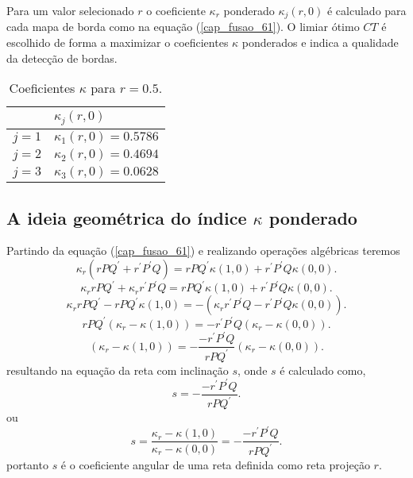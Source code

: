 Para um valor selecionado $r$ o coeficiente $\kappa_r$ ponderado $\kappa_j(r,0)$ é calculado para cada mapa de borda como na equação (\ref{cap_fusao_61}). O limiar ótimo $CT$ é escolhido de forma a maximizar o coeficientes $\kappa$ ponderados e indica a qualidade da detecção de bordas. 


\begin{table}[hbt]
	\centering
	\caption{Coeficientes $\kappa$ para $r=0.5$.}\label{cap_fusao_tab05}
\begin{tabular}{@{}ll@{}} \toprule
	     & $\kappa_j(r,0)$  \\ \midrule
	$j=1$  & $\kappa_1(r,0)= 0.5786$    \\ 
	$j=2$  & $\kappa_2(r,0)= 0.4694$    \\ 
    $j=3$  & $\kappa_3(r,0)= 0.0628$    \\ \bottomrule 
\end{tabular}
\end{table}

\subsection{A ideia geométrica do índice $\kappa$ ponderado}

Partindo da equação (\ref{cap_fusao_61}) e realizando operações algébricas teremos
\begin{equation}\nonumber
	\kappa_r (rPQ^{'} +r^{'}P^{'}Q)= rPQ^{'}\kappa(1,0) +r^{'}P^{'}Q\kappa(0,0).
\end{equation}
\begin{equation}\nonumber
	\kappa_r rPQ^{'} +\kappa_r r^{'}P^{'}Q= rPQ^{'}\kappa(1,0) +r^{'}P^{'}Q\kappa(0,0).
\end{equation}
\begin{equation}\nonumber
	\kappa_r rPQ^{'}-rPQ^{'}\kappa(1,0) = -( \kappa_r r^{'}P^{'}Q-r^{'}P^{'}Q\kappa(0,0)).
\end{equation}
\begin{equation}\nonumber
	rPQ^{'}(\kappa_r-\kappa(1,0)) = -r^{'}P^{'}Q( \kappa_r -\kappa(0,0)).
\end{equation}
\begin{equation}\label{cap_fusao_62}
	(\kappa_r-\kappa(1,0)) = - \frac{-r^{'}P^{'}Q}{rPQ^{'}}\left( \kappa_r -\kappa(0,0)\right).
\end{equation}
resultando na equação da reta com inclinação $s$, onde $s$ é calculado como,
\begin{equation}\label{cap_fusao_63}
	s = - \frac{-r^{'}P^{'}Q}{rPQ^{'}}.
\end{equation}
ou 
\begin{equation}\label{cap_fusao_64}
	s = \frac{\kappa_r-\kappa(1,0)}{ \kappa_r -\kappa(0,0)} = - \frac{-r^{'}P^{'}Q}{rPQ^{'}}.
\end{equation}
portanto $s$ é o coeficiente angular de uma reta definida como reta projeção $r$.


